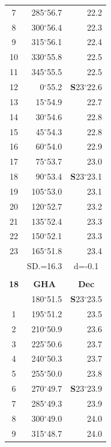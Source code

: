 \documentclass[10pt, a4paper]{report}
\begin{document}
\begin{scriptsize}
\begin{tabular*}{0.2\textwidth}[t]{@{\extracolsep{\fill}}|c|rr|}
7 & 285$^\circ$56.7 & 22.2\\
8 & 300$^\circ$56.4 & 22.3\\
9 & 315$^\circ$56.1 & \raisebox{0.24ex}{\boldmath$\cdot$~\boldmath$\cdot$~~}22.4\\
10 & 330$^\circ$55.8 & 22.5\\
11 & 345$^\circ$55.5 & 22.5\\[2Pt]
12 & 0$^\circ$55.2 & \textbf{S}23$^\circ$22.6\\
13 & 15$^\circ$54.9 & 22.7\\
14 & 30$^\circ$54.6 & 22.8\\
15 & 45$^\circ$54.3 & \raisebox{0.24ex}{\boldmath$\cdot$~\boldmath$\cdot$~~}22.8\\
16 & 60$^\circ$54.0 & 22.9\\
17 & 75$^\circ$53.7 & 23.0\\[2Pt]
18 & 90$^\circ$53.4 & \textbf{S}23$^\circ$23.1\\
19 & 105$^\circ$53.0 & 23.1\\
20 & 120$^\circ$52.7 & 23.2\\
21 & 135$^\circ$52.4 & \raisebox{0.24ex}{\boldmath$\cdot$~\boldmath$\cdot$~~}23.3\\
22 & 150$^\circ$52.1 & 23.3\\
23 & 165$^\circ$51.8 & 23.4\\
\hline
\rule{0pt}{2.4ex} & \multicolumn{1}{c}{SD.=16.3} & \multicolumn{1}{c|}{d=-0.1}\\
\hline
\multicolumn{1}{c}{}\\[-0.5ex]\hline
\multicolumn{1}{|c|}{\rule{0pt}{2.6ex}\textbf{18}} & \multicolumn{1}{c}{\textbf{GHA}} & \multicolumn{1}{c|}{\textbf{Dec}}\\
\hline\rule{0pt}{2.6ex}\noindent
0 & 180$^\circ$51.5 & \textbf{S}23$^\circ$23.5\\
1 & 195$^\circ$51.2 & 23.5\\
2 & 210$^\circ$50.9 & 23.6\\
3 & 225$^\circ$50.6 & \raisebox{0.24ex}{\boldmath$\cdot$~\boldmath$\cdot$~~}23.7\\
4 & 240$^\circ$50.3 & 23.7\\
5 & 255$^\circ$50.0 & 23.8\\[2Pt]
6 & 270$^\circ$49.7 & \textbf{S}23$^\circ$23.9\\
7 & 285$^\circ$49.3 & 23.9\\
8 & 300$^\circ$49.0 & 24.0\\
9 & 315$^\circ$48.7 & \raisebox{0.24ex}{\boldmath$\cdot$~\boldmath$\cdot$~~}24.0\\

\end{tabular*}
\end{scriptsize}
\end{document}
